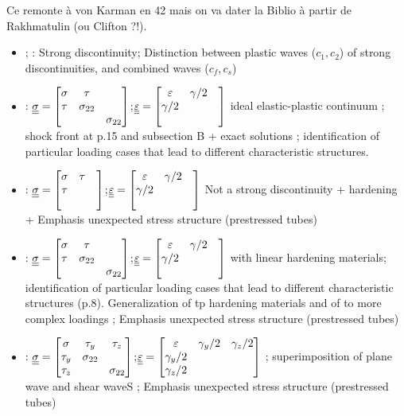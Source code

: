 Ce remonte à von Karman en 42 mais on va dater la Biblio à partir de Rakhmatulin (ou Clifton ?!).
\begin{itemize}
\item \cite{Rakhmatulin} ; \cite{CRISTESCU19591605} : Strong discontinuity; Distinction between plastic waves ($c_1,c_2$) of strong discontinuities, and combined waves ($c_f,c_s$)
\item \cite{Bleich}: ${\underline{\underline{\sigma}}}=\left[\begin{matrix}\sigma & \tau & \\ \tau & \sigma_{22} & \\ & & \sigma_{22}\end{matrix}\right]$;${\underline{\underline{\varepsilon}}}=\left[\begin{matrix}\varepsilon & \gamma/2 & \\ \gamma/2 &  & \\ & & \end{matrix}\right]$ ideal elastic-plastic continuum ; shock front at p.15 and subsection B + exact solutions ; identification of particular loading cases that lead to different characteristic structures.
\item \cite{Clifton}: ${\underline{\underline{\sigma}}}=\left[\begin{matrix}\sigma & \tau & \\ \tau & & \\ & & \end{matrix}\right]$;${\underline{\underline{\varepsilon}}}=\left[\begin{matrix}\varepsilon & \gamma/2 & \\ \gamma/2 &  & \\ & & \end{matrix}\right]$ Not a strong discontinuity + hardening + Emphasis unexpected stress structure (prestressed tubes)
\item \cite{Ting68}: ${\underline{\underline{\sigma}}}=\left[\begin{matrix}\sigma & \tau & \\ \tau & \sigma_{22} & \\ & & \sigma_{22}\end{matrix}\right]$;${\underline{\underline{\varepsilon}}}=\left[\begin{matrix}\varepsilon & \gamma/2 & \\ \gamma/2 &  & \\ & & \end{matrix}\right]$ with linear hardening materials; identification of particular loading cases that lead to different characteristic structures (p.8). Generalization of \cite{Bleich} tp hardening materials and of \cite{Clifton} to more complex loadings ; Emphasis unexpected stress structure (prestressed tubes)
\item \cite{Ting69}:  ${\underline{\underline{\sigma}}}=\left[\begin{matrix}\sigma & \tau_y & \tau_z\\ \tau_y & \sigma_{22} & \\\tau_z & & \sigma_{22}\end{matrix}\right]$;${\underline{\underline{\varepsilon}}}=\left[\begin{matrix}\varepsilon & \gamma_y/2 & \gamma_z/2\\ \gamma_y/2 &  & \\ \gamma_z/2& & \end{matrix}\right]$ ; superimposition of plane wave and shear waveS ; Emphasis unexpected stress structure (prestressed tubes)

\end{itemize}
